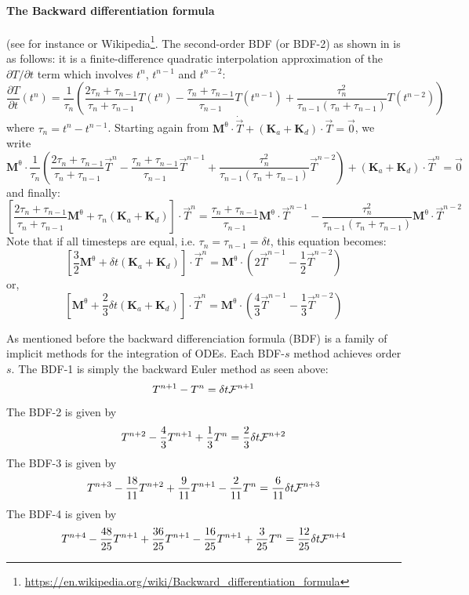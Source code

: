 \paragraph{The Backward differentiation formula} (see for instance \cite{hawa91} or Wikipedia\footnote{\url{https://en.wikipedia.org/wiki/Backward_differentiation_formula}}. The second-order BDF (or BDF-2) as shown in \cite{krhb12} is as follows: it is a finite-difference 
quadratic interpolation approximation of the $\partial T/\partial t$ term which involves
$t^n$, $t^{n-1}$ and $t^{n-2}$:
\begin{equation}
\frac{\partial T}{\partial t}(t^n) =
\frac{1}{\tau_n} \left( \frac{2\tau_n + \tau_{n-1}}{\tau_n+\tau_{n-1} } T(t^n)  
- \frac{\tau_n +\tau_{n-1}}{\tau_{n-1}} T(t^{n-1})
+ \frac{\tau_n^2}{\tau_{n-1}(\tau_n+\tau_{n-1})} T(t^{n-2})
\right)
\end{equation}
where $\tau_n=t^n-t^{n-1}$.
Starting again from 
${\bm M}^\uptheta \cdot \dot{\vec T} + ({\bm K}_a + {\bm K}_d) \cdot \vec T = \vec 0$,
we write 
\[
{\bm M}^\uptheta \cdot 
\frac{1}{\tau_n} \left( \frac{2\tau_n + \tau_{n-1}}{\tau_n+\tau_{n-1} } \vec T^n  
- \frac{\tau_n +\tau_{n-1}}{\tau_{n-1}} \vec T^{n-1}
+ \frac{\tau_n^2}{\tau_{n-1}(\tau_n+\tau_{n-1})} \vec T^{n-2} \right)
+ ({\bm K}_a + {\bm K}_d) \cdot \vec T^n = \vec 0
\]
and finally:
\[
\left[
\frac{2\tau_n + \tau_{n-1}}{\tau_n+\tau_{n-1} }
{\bm M}^\uptheta
+ \tau_n({\bm K}_a + {\bm K}_d)
\right]
 \cdot \vec T^n =
 \frac{\tau_n +\tau_{n-1}}{\tau_{n-1}} {\bm M}^\uptheta \cdot \vec T^{n-1}
- \frac{\tau_n^2}{\tau_{n-1}(\tau_n+\tau_{n-1})} {\bm M}^\uptheta \cdot \vec T^{n-2}
\]
Note that if all timesteps are equal, i.e. $\tau_n=\tau_{n-1}=\delta t$, this equation becomes:
\[
\left[
\frac{3}{2}
{\bm M}^\uptheta
+ \delta t({\bm K}_a + {\bm K}_d)
\right]
 \cdot \vec T^n =
{\bm M}^\uptheta \cdot \left(2 \vec T^{n-1} - \frac{1}{2} \vec T^{n-2} \right)
\]
or, 
\[
\left[
{\bm M}^\uptheta
+ \frac{2}{3}\delta t({\bm K}_a + {\bm K}_d)
\right]
 \cdot \vec T^n =
{\bm M}^\uptheta \cdot \left( \frac{4}{3} \vec T^{n-1} - \frac{1}{3} \vec T^{n-2} \right)
\]

As mentioned before the 
backward differenciation formula (BDF) is a family of implicit methods
for the integration of ODEs. Each BDF-$s$ method achieves order $s$.
The BDF-1 is simply the backward Euler method as seen above:
\[
T^{n+1}-T^n=\delta t {\cal F}^{n+1}
\]
The BDF-2 is given by 
\[
T^{n+2} - \frac{4}{3}T^{n+1} +\frac{1}{3} T^n = \frac{2}{3} \delta t {\cal F}^{n+2}
\]
The BDF-3 is given by 
\[
T^{n+3} - \frac{18}{11}T^{n+2} +\frac{9}{11} T^{n+1} -\frac{2}{11}T^n = \frac{6}{11} \delta t {\cal F}^{n+3}
\]
The BDF-4 is given by 
\[
T^{n+4}-\frac{48}{25}T^{n+1}+\frac{36}{25}T^{n+1}-\frac{16}{25}T^{n+1}+\frac{3}{25}T^n = \frac{12}{25}\delta t {\cal F}^{n+4}
\]


